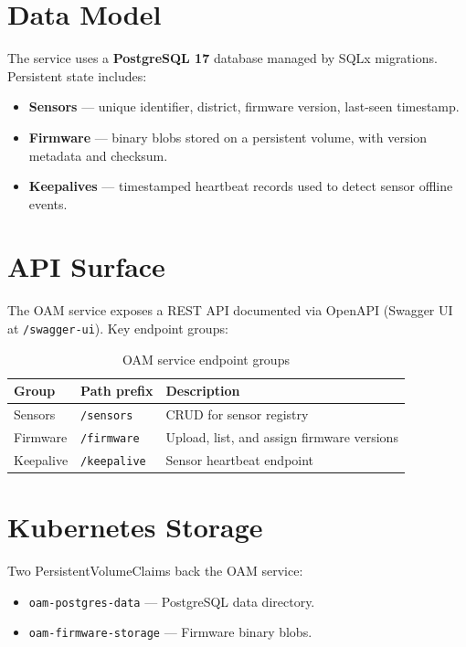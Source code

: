 \documentclass[12pt,a4paper,oneside]{report}
\begin{document}
\section{Data Model}

The service uses a \textbf{PostgreSQL 17} database managed by SQLx migrations. Persistent state includes:

\begin{itemize}[noitemsep]
  \item \textbf{Sensors} — unique identifier, district, firmware version, last-seen timestamp.
  \item \textbf{Firmware} — binary blobs stored on a persistent volume, with version metadata and checksum.
  \item \textbf{Keepalives} — timestamped heartbeat records used to detect sensor offline events.
\end{itemize}

\section{API Surface}

The OAM service exposes a REST API documented via OpenAPI (Swagger UI at \texttt{/swagger-ui}). Key endpoint groups:

\begin{table}[H]
\centering
\caption{OAM service endpoint groups}
\label{tab:oam-endpoints}
\renewcommand{\arraystretch}{1.3}
\begin{tabular}{l l l}
\toprule
\textbf{Group} & \textbf{Path prefix} & \textbf{Description} \\
\midrule
Sensors     & \texttt{/sensors}      & CRUD for sensor registry \\
Firmware    & \texttt{/firmware}     & Upload, list, and assign firmware versions \\
Keepalive   & \texttt{/keepalive}    & Sensor heartbeat endpoint \\
\bottomrule
\end{tabular}
\end{table}

\section{Kubernetes Storage}

Two PersistentVolumeClaims back the OAM service:

\begin{itemize}[noitemsep]
  \item \texttt{oam-postgres-data}    — PostgreSQL data directory.
  \item \texttt{oam-firmware-storage} — Firmware binary blobs.
\end{itemize}
\end{document}
